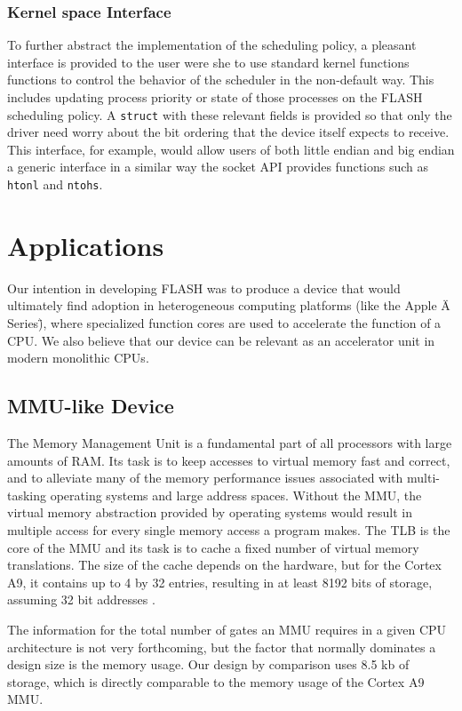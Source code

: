 \documentclass{sig-alternate-10pt}
\begin{document}
\subsubsection{Kernel space Interface}
To further abstract the implementation of the scheduling policy, a pleasant
interface is provided to the user were she to use standard kernel functions
functions to control the behavior of the scheduler in the non-default way.
This includes updating process priority or state of those processes on the
FLASH scheduling policy.  A \texttt{struct} with these relevant fields is
provided so that only the driver need worry about the bit ordering that the
device itself expects to receive.  This interface, for example, would allow
users of both little endian and big endian a generic interface in a similar
way the socket API provides functions such as \texttt{htonl} and
\texttt{ntohs}.


\section{Applications}
\label{sec:apps}
Our intention in developing FLASH was to produce a device that would ultimately find adoption in heterogeneous computing platforms (like the Apple \"A Series\"), where specialized function cores are used to accelerate the function of a CPU. We also believe that our device can be relevant as an accelerator unit in modern monolithic CPUs.

\subsection{MMU-like Device}
\label{subsec:mmu}
The Memory Management Unit is a fundamental part of all processors with large amounts of RAM. Its task is to keep accesses to virtual memory fast and correct, and to alleviate many of the memory performance issues associated with multi-tasking operating systems and large address spaces. Without the MMU, the virtual memory abstraction provided by operating systems would result in multiple access for every single memory access a program makes. The TLB is the core of the MMU and its task is to cache a fixed number of virtual memory translations. The size of the cache depends on the hardware, but for the Cortex A9, it contains up to 4 by 32 entries, resulting in at least 8192 bits of storage, assuming 32 bit addresses \cite{arm_mmu}.

The information for the total number of gates an MMU requires in a given CPU architecture is not very forthcoming, but the factor that normally dominates a design size is the memory usage. Our design by comparison uses 8.5 kb of storage, which is directly comparable to the memory usage of the Cortex A9 MMU.
\end{document}
